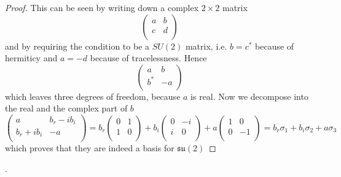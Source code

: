     \begin{proof}
        This can be seen by writing down a complex $2 \times 2$ matrix 
        \begin{equation*}
            \begin{pmatrix}
                a & b \\ c & d \\
            \end{pmatrix}
        \end{equation*}
        and by requiring the condition to be a $SU(2)$ matrix, i.e. $b = c^*$ because of hermiticy and $a = -d$ because of tracelessness. Hence
        \begin{equation*}
            \begin{pmatrix}
                a & b \\ b^* & -a \\
            \end{pmatrix}
        \end{equation*}
        which leaves three degrees of freedom, because $a$ is real. Now we decompose into the real and the complex part of $b$
        \begin{equation*}
            \begin{pmatrix}
                a & b_r - i b_i \\ b_r + i b_i & - a\\
            \end{pmatrix} = b_r \begin{pmatrix}
                0 & 1 \\ 1 & 0 \\
            \end{pmatrix} + b_i \begin{pmatrix}
                0 & -i \\ i & 0 \\
            \end{pmatrix} + a \begin{pmatrix}
                1 & 0 \\ 0 & -1 \\
            \end{pmatrix} = b_r \sigma_1 + b_i \sigma_2 + a \sigma_3
        \end{equation*}
        which proves that they are indeed a basis for $\mathfrak{su}(2)$
    \end{proof}. 

